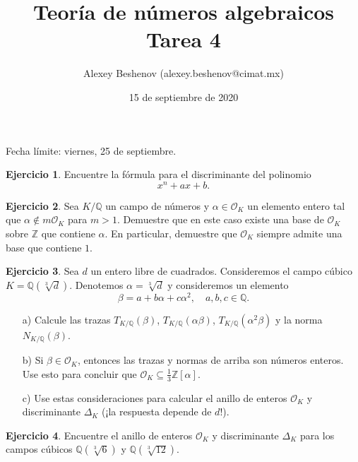 \documentclass{article}
\title{Teoría de números algebraicos\\Tarea 4}
\author{Alexey Beshenov (alexey.beshenov@cimat.mx)}
\date{15 de septiembre de 2020}
\newcounter{tarea}
\theoremstyle{definition}
\newtheorem{ejercicio}{Ejercicio}[tarea]
\newcommand{\ZZ}{\mathbb{Z}}
\newcommand{\QQ}{\mathbb{Q}}
\renewcommand{\O}{\mathcal{O}}
\begin{document}
{\sffamily\bfseries\maketitle}

\noindent Fecha límite: viernes, 25 de septiembre.

\ifdefined\solutions
\else
\thispagestyle{empty}
\fi

\vspace{1em}

\begin{ejercicio}
  Encuentre la fórmula para el discriminante del polinomio
  $$x^n + ax + b.$$
\end{ejercicio}

\begin{ejercicio}
  Sea $K/\QQ$ un campo de números y $\alpha \in \O_K$ un elemento entero tal que
  $\alpha \notin m \O_K$ para $m > 1$. Demuestre que en este caso
  existe una base de $\O_K$ sobre $\ZZ$ que contiene $\alpha$. En particular,
  demuestre que $\O_K$ siempre admite una base que contiene $1$.
\end{ejercicio}

\begin{ejercicio}
  Sea $d$ un entero libre de cuadrados. Consideremos el campo cúbico
  $K = \QQ (\sqrt[3]{d})$. Denotemos $\alpha = \sqrt[3]{d}$ y consideremos
  un elemento
  $$\beta = a + b\alpha + c\alpha^2, \quad a,b,c \in \QQ.$$

  \begin{enumerate}
  \item[a)] Calcule las trazas 
    $T_{K/\QQ} (\beta)$, $T_{K/\QQ} (\alpha\beta)$, $T_{K/\QQ} (\alpha^2\beta)$
    y la norma $N_{K/\QQ} (\beta)$.

  \item[b)] Si $\beta \in \O_K$, entonces las trazas y normas de arriba son
    números enteros. Use esto para concluir que
    $\O_K  \subseteq \frac{1}{3} \ZZ [\alpha]$.

  \item[c)] Use estas consideraciones para calcular el anillo de enteros $\O_K$
    y discriminante $\Delta_K$ (¡la respuesta depende de $d$!).
  \end{enumerate}
\end{ejercicio}

\begin{ejercicio}
  Encuentre el anillo de enteros $\O_K$ y discriminante $\Delta_K$ para
  los campos cúbicos $\QQ (\sqrt[3]{6})$ y $\QQ (\sqrt[3]{12})$.
\end{ejercicio}
\end{document}
